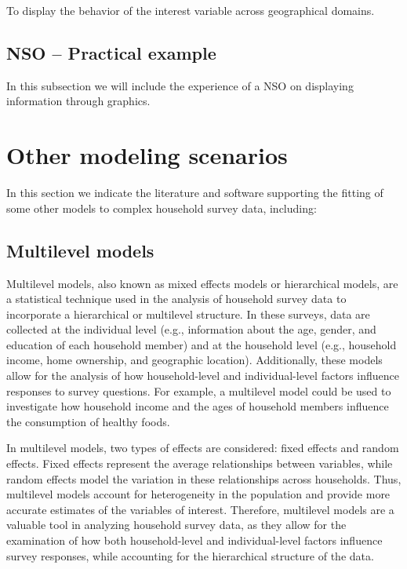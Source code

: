 \documentclass[
  12pt,
]{book}
\begin{document}
To display the behavior of the interest variable across geographical domains.

\hypertarget{nso-practical-example-3}{%
\section{NSO -- Practical example}\label{nso-practical-example-3}}

In this subsection we will include the experience of a NSO on displaying information through graphics.

\hypertarget{other-modeling-scenarios}{%
\chapter{Other modeling scenarios}\label{other-modeling-scenarios}}

In this section we indicate the literature and software supporting the fitting of some other models to complex household survey data, including:

\hypertarget{multilevel-models}{%
\section{Multilevel models}\label{multilevel-models}}

Multilevel models, also known as mixed effects models or hierarchical models, are a statistical technique used in the analysis of household survey data to incorporate a hierarchical or multilevel structure. In these surveys, data are collected at the individual level (e.g., information about the age, gender, and education of each household member) and at the household level (e.g., household income, home ownership, and geographic location). Additionally, these models allow for the analysis of how household-level and individual-level factors influence responses to survey questions. For example, a multilevel model could be used to investigate how household income and the ages of household members influence the consumption of healthy foods.

In multilevel models, two types of effects are considered: fixed effects and random effects. Fixed effects represent the average relationships between variables, while random effects model the variation in these relationships across households. Thus, multilevel models account for heterogeneity in the population and provide more accurate estimates of the variables of interest. Therefore, multilevel models are a valuable tool in analyzing household survey data, as they allow for the examination of how both household-level and individual-level factors influence survey responses, while accounting for the hierarchical structure of the data.
\end{document}
